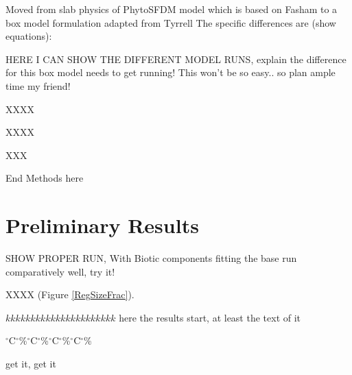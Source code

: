 Moved from slab physics of PhytoSFDM model \citep{Acevedo-Trejos2016} which is based on Fasham \citep{Evans2003,Fasham1990a} to a box model formulation adapted from Tyrrell \citep{Tyrrell1999}
The specific differences are (show equations):

HERE I CAN SHOW THE DIFFERENT MODEL RUNS, explain the difference
for this box model needs to get running! This won't be so easy.. so plan ample time my friend!

XXXX

XXXX

XXX


End Methods here

\section{Preliminary Results}


SHOW PROPER RUN, With Biotic components fitting the base run comparatively well, try it!

XXXX (Figure \ref{RegSizeFrac}).



$kkkkkkkkkkkkkkkkkkkkkk$ here the results start, at least the text of it

$^{\circ}$C$^{\circ}$\%$^{\circ}$C$^{\circ}$\%$^{\circ}$C$^{\circ}$\%$^{\circ}$C$^{\circ}$\%


get it, get it




